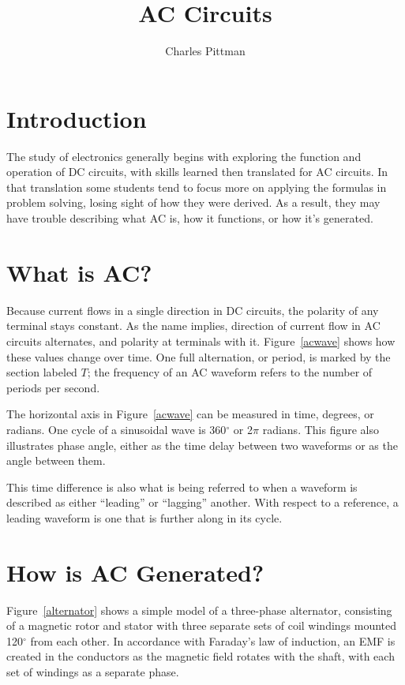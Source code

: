 \documentclass[11pt]{article}
\author{Charles Pittman}
\title{AC Circuits}
\begin{document}
  \maketitle


  \section*{Introduction}
  The study of electronics generally begins with exploring the function and
  operation of \ac{DC} circuits, with skills learned then translated for
  \ac{AC} circuits.  In that translation some students tend to focus more on
  applying the formulas in problem solving, losing sight of how they were
  derived.  As a result, they may have trouble describing what \ac{AC} is, how
  it functions, or how it's generated.

  \section*{What is \ac{AC}?}
  Because current flows in a single direction in \ac{DC} circuits, the polarity
  of any terminal stays constant.  As the name implies, direction of current
  flow in \ac{AC} circuits alternates, and polarity at terminals with it.
  Figure~\ref{acwave} shows how these values change over time.  One full
  alternation, or period, is marked by the section labeled $T$; the frequency
  of an \ac{AC} waveform refers to the number of periods per second.

  The horizontal axis in Figure~\ref{acwave} can be measured in time, degrees,
  or radians.  One cycle of a sinusoidal wave is 360$^\circ$ or 2$\pi$ radians.
  This figure also illustrates phase angle, either as the time delay between
  two waveforms or as the angle between them.

  This time difference is also what is being referred to when a waveform is
  described as either ``leading'' or ``lagging'' another.  With respect to a
  reference, a leading waveform is one that is further along in its cycle.

  \section*{How is \ac{AC} Generated?}
  Figure~\ref{alternator} shows a simple model of a three-phase alternator,
  consisting of a magnetic rotor and stator with three separate sets of coil
  windings mounted 120$^\circ$ from each other.  In accordance with Faraday's
  law of induction, an \ac{EMF} is created in the conductors as the magnetic
  field rotates with the shaft, with each set of windings as a separate phase.
\end{document}
